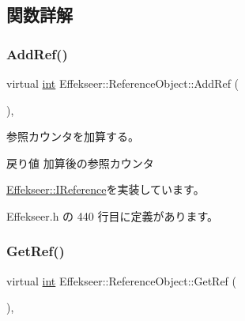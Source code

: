 \subsection{関数詳解}
\mbox{\label{class_effekseer_1_1_reference_object_a1cc3feeee39b72aea152ed223dbd0fa7}} 
\subsubsection{\texorpdfstring{Add\+Ref()}{AddRef()}}
{\footnotesize\ttfamily virtual \mbox{\hyperlink{namespace_effekseer_ace0abf7c2e6947e519ebe8b54cbcc30a}{int}} Effekseer\+::\+Reference\+Object\+::\+Add\+Ref (\begin{DoxyParamCaption}{ }\end{DoxyParamCaption})\hspace{0.3cm}{\ttfamily [inline]}, {\ttfamily [virtual]}}



参照カウンタを加算する。 

\begin{DoxyReturn}{戻り値}
加算後の参照カウンタ 
\end{DoxyReturn}


\mbox{\hyperlink{class_effekseer_1_1_i_reference_a3e3b54e8e5081e24f5784e4f9b8f6257}{Effekseer\+::\+I\+Reference}}を実装しています。



 Effekseer.\+h の 440 行目に定義があります。

\mbox{\label{class_effekseer_1_1_reference_object_a4b8c3d79c58ca527850733691053cf5a}} 
\subsubsection{\texorpdfstring{Get\+Ref()}{GetRef()}}
{\footnotesize\ttfamily virtual \mbox{\hyperlink{namespace_effekseer_ace0abf7c2e6947e519ebe8b54cbcc30a}{int}} Effekseer\+::\+Reference\+Object\+::\+Get\+Ref (\begin{DoxyParamCaption}{ }\end{DoxyParamCaption})\hspace{0.3cm}{\ttfamily [inline]}, {\ttfamily [virtual]}}



